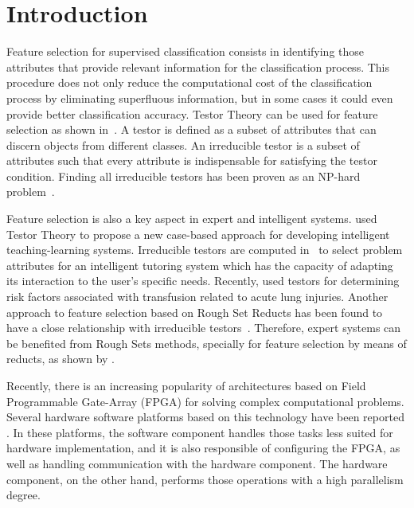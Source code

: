 \documentclass[authoryear,preprint,review,12pt]{elsarticle}
\begin{document}

\section{Introduction}
\label{sect:1}

Feature selection for supervised classification consists in identifying those attributes that 
provide relevant information for the classification process. This procedure does not only reduce the 
computational cost of the classification process by eliminating superfluous information, but in some cases 
it could even provide better classification accuracy. 
Testor Theory can be used for feature selection as shown in~\citep{R27,R5}. A testor is defined as a subset 
of attributes that can discern objects from different classes. An irreducible testor is a subset of attributes 
such that every attribute is indispensable for satisfying the testor condition. Finding all irreducible 
testors has been proven as an NP-hard problem~\citep{R40}.

Feature selection is also a key aspect in expert and intelligent systems. \cite{Mart07} used Testor Theory to
propose a new case-based approach for developing intelligent teaching-learning systems.  Irreducible testors
are computed in~\citep{Med07} to select problem attributes for an intelligent tutoring system 
which has the capacity of adapting its interaction to the user's specific needs. Recently, \cite{Torr14} used 
testors for determining risk factors associated with transfusion related to acute lung injuries. Another approach to 
feature selection based on Rough Set Reducts has been found to have a close relationship with irreducible 
testors~\citep{Lazo15}. Therefore, expert systems can be benefited from Rough Sets methods, specially for 
feature selection by means of reducts, as shown by \cite{Yah00}.

Recently, there is an increasing popularity of architectures based on Field Programmable Gate-Array (FPGA) 
for solving complex computational problems. Several hardware software platforms based on this technology have 
been reported \citep{R29,R30}. 
In these platforms, the software component handles those tasks less suited for hardware implementation, 
and it is also responsible of configuring the FPGA, as well as handling communication with the hardware component. 
The hardware component, on the other hand, performs those operations with a high parallelism degree.
\end{document}
